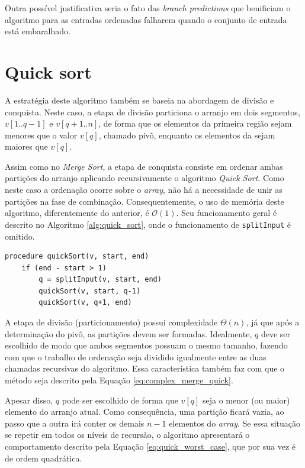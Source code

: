 \documentclass[12pt]{article}
\begin{document}
Outra possível justificativa seria o fato das \textit{branch predictions} que benificiam o algoritmo para as entradas ordenadas falharem quando o conjunto de entrada está embaralhado.






\section{Quick sort}

A estratégia deste algoritmo também se baseia na abordagem de divisão e conquista. Neste caso, a etapa de divisão particiona o arranjo em dois segmentos, $v[1..q-1]$ e $v[q+1..n]$, de forma que os elementos da primeira região sejam menores que o valor $v[q]$, chamado pivô, enquanto os elementos da sejam maiores que $v[q]$.

Assim como no \textit{Merge Sort}, a etapa de conquista consiste em ordenar ambas partições do arranjo aplicando recursivamente o algoritmo \textit{Quick Sort}. Como neste caso a ordenação ocorre sobre o \textit{array}, não há a necessidade de unir as partições na fase de combinação. Consequentemente, o uso de memória deste algoritmo, diferentemente do anterior, é $\mathcal{O}(1)$. Seu funcionamento geral é descrito no Algoritmo \ref{alg:quick_sort}, onde o funcionamento de \texttt{splitInput} é omitido.

\begin{lstlisting}[caption=\textit{Quick sort}, float, label=alg:quick_sort, captionpos=b, h]
procedure quickSort(v, start, end)
    if (end - start > 1)
        q = splitInput(v, start, end)
        quickSort(v, start, q-1)
        quickSort(v, q+1, end)
\end{lstlisting}

A etapa de divisão (particionamento) possui complexidade $\Theta(n)$, já que após a determinação do pivô, as partições devem ser formadas. Idealmente, $q$ deve ser escolhido de modo que ambos segmentos possuam o mesmo tamanho, fazendo com que o trabalho de ordenação seja dividido igualmente entre as duas chamadas recursivas do algoritmo. Essa característica também faz com que o método seja descrito pela Equação \ref{eq:complex_merge_quick}.

Apesar disso, $q$ pode ser escolhido de forma que $v[q]$ seja o menor (ou maior) elemento do arranjo atual. Como consequência, uma partição ficará vazia, ao passo que a outra irá conter os demais $n-1$ elementos do \textit{array}. Se essa situação se repetir em todos os níveis de recursão, o algoritmo apresentará o comportamento descrito pela Equação \ref{eq:quick_worst_case}, que por sua vez é de ordem quadrática.
\end{document}
